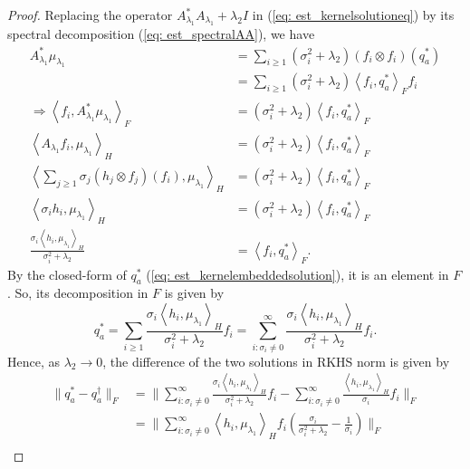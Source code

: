 \begin{proof}
    Replacing the operator $A_{\lambda_1}^*A_{\lambda_1}+\lambda_2I$ in (\ref{eq: est_kernelsolutioneq}) by its spectral decomposition (\ref{eq: est_spectralAA}), 
    we have 
    \begin{align*}
        A_{\lambda_1}^*\mu_{\lambda_1} &= \sum_{i\geq 1}(\sigma_i^2+\lambda_2)(f_i\otimes f_i)(q_a^*) \\
                                       &= \sum_{i\geq 1}(\sigma_i^2+\lambda_2)\left\langle f_i,q_a^*\right\rangle _F f_i \\
        \Longrightarrow \left\langle f_i,A_{\lambda_1}^*\mu_{\lambda_1}\right\rangle _F &= (\sigma_i^2+\lambda_2)\left\langle f_i,q_a^*\right\rangle _F \\
        \left\langle A_{\lambda_1}f_i,\mu_{\lambda_1}\right\rangle _H &= (\sigma_i^2+\lambda_2)\left\langle f_i,q_a^*\right\rangle _F \\
        \left\langle \sum_{j\geq 1}\sigma_j (h_j\otimes f_j)(f_i), \mu_{\lambda_1}\right\rangle _H &= (\sigma_i^2+\lambda_2)\left\langle f_i,q_a^*\right\rangle _F \\
        \left\langle \sigma_ih_i, \mu_{\lambda_1}\right\rangle _H &= (\sigma_i^2+\lambda_2)\left\langle f_i,q_a^*\right\rangle _F \\
        \frac{\sigma_i\left\langle h_i, \mu_{\lambda_1}\right\rangle _H}{\sigma_i^2+\lambda_2} &= \left\langle f_i,q_a^*\right\rangle _F. 
    \end{align*}
    By the closed-form of $q_a^*$ (\ref{eq: est_kernelembeddedsolution}), it is an element in $F$. So, its decomposition in $F$ is given by 
    \begin{equation}
        \label{eq: est_kernelsolutiondecomposition}
        q_a^* = \sum_{i\geq 1} \frac{\sigma_i\left\langle h_i, \mu_{\lambda_1}\right\rangle _H}{\sigma_i^2+\lambda_2} f_i = \sum_{i:\sigma_i\neq 0}^{\infty} \frac{\sigma_i\left\langle h_i, \mu_{\lambda_1}\right\rangle _H}{\sigma_i^2+\lambda_2} f_i. 
    \end{equation}
    Hence, as $\lambda_2\longrightarrow 0$, the difference of the two solutions in RKHS norm is given by  
    \begin{align*}
        \|q_a^*-q_a^{\dagger}\|_F &= \bigg\|\sum_{i:\sigma_i\neq 0}^{\infty} \frac{\sigma_i\left\langle h_i, \mu_{\lambda_1}\right\rangle _H}{\sigma_i^2+\lambda_2} f_i - \sum_{i:\sigma_i\neq 0}^{\infty} \frac{\left\langle h_i, \mu_{\lambda_1}\right\rangle _H}{\sigma_i} f_i\bigg\|_F \\
                                  &= \bigg\|\sum_{i:\sigma_i\neq 0}^{\infty} \left\langle h_i, \mu_{\lambda_1}\right\rangle _H f_i (\frac{\sigma_i}{\sigma_i^2+\lambda_2}-\frac{1}{\sigma_i})\bigg\|_F \\

\end{align*}
\end{proof}
